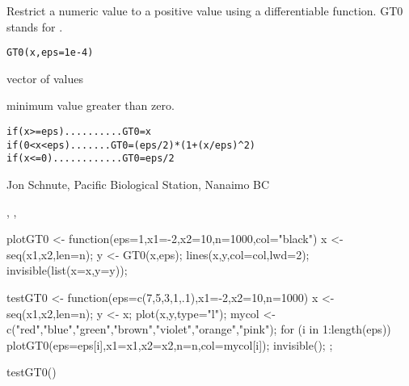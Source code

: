 \documentclass[letterpaper]{book}
\begin{document}
\begin{Description}\relax
Restrict a numeric value  to a positive value using a differentiable function. 
GT0 stands for .
\end{Description}
\begin{Usage}
\begin{verbatim}GT0(x,eps=1e-4)\end{verbatim}
\end{Usage}
\begin{Arguments}
\begin{ldescription}
\item[\code{x}] vector of values
\item[\code{eps}] minimum value greater than zero.
\end{ldescription}
\end{Arguments}
\begin{Details}\relax
\begin{alltt}
   if (x >= eps)..........GT0 = x
   if (0 < x < eps).......GT0 = (eps/2) * (1 + (x/eps)\textasciicircum{}2)
   if (x <= 0)............GT0 = eps/2
\end{alltt}
\end{Details}
\begin{Author}\relax
Jon Schnute, Pacific Biological Station, Nanaimo BC
\end{Author}
\begin{SeeAlso}\relax
{}, , 
\end{SeeAlso}
\begin{Examples}
\begin{ExampleCode}
plotGT0 <- function(eps=1,x1=-2,x2=10,n=1000,col="black") {
        x <- seq(x1,x2,len=n); y <- GT0(x,eps);
        lines(x,y,col=col,lwd=2); invisible(list(x=x,y=y)); }

testGT0 <- function(eps=c(7,5,3,1,.1),x1=-2,x2=10,n=1000) {
        x <- seq(x1,x2,len=n); y <- x;
        plot(x,y,type="l");
        mycol <- c("red","blue","green","brown","violet","orange","pink");
        for (i in 1:length(eps)) 
                plotGT0(eps=eps[i],x1=x1,x2=x2,n=n,col=mycol[i]);
        invisible(); };

testGT0()
\end{ExampleCode}
\end{Examples}
\end{document}

